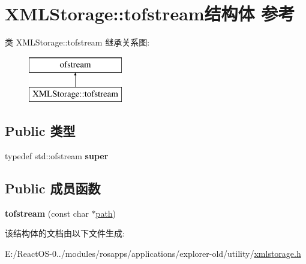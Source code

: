\hypertarget{struct_x_m_l_storage_1_1tofstream}{}\section{X\+M\+L\+Storage\+:\+:tofstream结构体 参考}
\label{struct_x_m_l_storage_1_1tofstream}
类 X\+M\+L\+Storage\+:\+:tofstream 继承关系图\+:\begin{figure}[H]
\begin{center}
\leavevmode
\includegraphics[height=2.000000cm]{struct_x_m_l_storage_1_1tofstream}
\end{center}
\end{figure}
\subsection*{Public 类型}
\begin{DoxyCompactItemize}
\item 
\mbox{\label{struct_x_m_l_storage_1_1tofstream_a950d4fc5066e844801a641e8e2142045}} 
typedef std\+::ofstream {\bfseries super}
\end{DoxyCompactItemize}
\subsection*{Public 成员函数}
\begin{DoxyCompactItemize}
\item 
\mbox{\label{struct_x_m_l_storage_1_1tofstream_a187cbd0e8bf0b99cbbb1c31b67ab6a10}} 
{\bfseries tofstream} (const char $\ast$\hyperlink{structpath}{path})
\end{DoxyCompactItemize}


该结构体的文档由以下文件生成\+:\begin{DoxyCompactItemize}
\item 
E\+:/\+React\+O\+S-\/0../modules/rosapps/applications/explorer-\/old/utility/\hyperlink{xmlstorage_8h}{xmlstorage.\+h}\end{DoxyCompactItemize}
